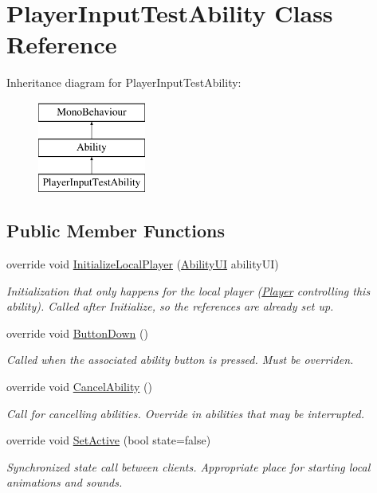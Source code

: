 \hypertarget{class_player_input_test_ability}{}\section{Player\+Input\+Test\+Ability Class Reference}
\label{class_player_input_test_ability}
Inheritance diagram for Player\+Input\+Test\+Ability\+:\begin{figure}[H]
\begin{center}
\leavevmode
\includegraphics[height=3.000000cm]{class_player_input_test_ability}
\end{center}
\end{figure}
\subsection*{Public Member Functions}
\begin{DoxyCompactItemize}
\item 
override void \hyperlink{class_player_input_test_ability_a8ac71832a1fd267f30881d969767ca16}{Initialize\+Local\+Player} (\hyperlink{class_ability_u_i}{Ability\+UI} ability\+UI)
\begin{DoxyCompactList}\small\item\em Initialization that only happens for the local player (\hyperlink{class_player}{Player} controlling this ability). Called after Initialize, so the references are already set up. \end{DoxyCompactList}\item 
override void \hyperlink{class_player_input_test_ability_a061fe838c77962560b24ff59f2a3dab8}{Button\+Down} ()
\begin{DoxyCompactList}\small\item\em Called when the associated ability button is pressed. Must be overriden. \end{DoxyCompactList}\item 
override void \hyperlink{class_player_input_test_ability_adc59dfeabbb2e1cdff7b81797c9f3946}{Cancel\+Ability} ()
\begin{DoxyCompactList}\small\item\em Call for cancelling abilities. Override in abilities that may be interrupted. \end{DoxyCompactList}\item 
override void \hyperlink{class_player_input_test_ability_a41b2128e36247c96b00df0c1052873f3}{Set\+Active} (bool state=false)
\begin{DoxyCompactList}\small\item\em Synchronized state call between clients. Appropriate place for starting local animations and sounds. \end{DoxyCompactList}\end{DoxyCompactItemize}
